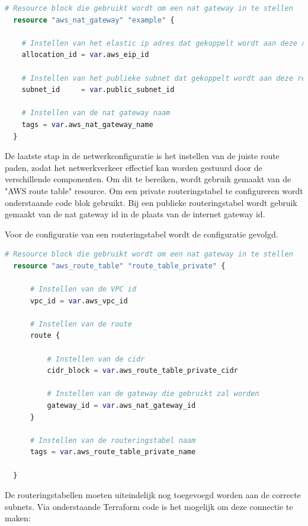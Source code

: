 \begin{lstlisting}[language=terraform]  
  # Resource block die gebruikt wordt om een nat gateway in te stellen
  resource "aws_nat_gateway" "example" {
  
    # Instellen van het elastic ip adres dat gekoppelt wordt aan deze resource
    allocation_id = var.aws_eip_id
  
    # Instellen van het publieke subnet dat gekoppelt wordt aan deze resource
    subnet_id     = var.public_subnet_id
  
    # Instellen van de nat gateway naam
    tags = var.aws_nat_gateway_name
  }
\end{lstlisting}
\clearpage

De laatste stap in de netwerkconfiguratie is het instellen van de juiste route paden, zodat het netwerkverkeer effectief kan worden gestuurd door de verschillende componenten. Om dit te bereiken, wordt gebruik gemaakt van de "AWS route table" resource. Om een private routeringstabel te configureren wordt onderstaande code blok gebruikt. Bij een publieke routeringstabel wordt gebruik gemaakt van de nat gateway id in de plaats van de internet gateway id.
\newline

Voor de configuratie van een routeringstabel wordt de configuratie gevolgd.
\newline

\begin{lstlisting}[language=terraform]  
  # Resource block die gebruikt wordt om een nat gateway in te stellen
  resource "aws_route_table" "route_table_private" {
  
      # Instellen van de VPC id
      vpc_id = var.aws_vpc_id
  
      # Instellen van de route
      route {
  
          # Instellen van de cidr
          cidr_block = var.aws_route_table_private_cidr
  
          # Instellen van de gateway die gebruikt zal worden
          gateway_id = var.aws_nat_gateway_id
      }
  
      # Instellen van de routeringstabel naam
      tags = var.aws_route_table_private_name
    
  }
\end{lstlisting}

\vspace{0.5cm}
De routeringstabellen moeten uiteindelijk nog toegevoegd worden aan de correcte subnets. Via onderstaande Terraform code is het mogelijk om deze connectie te maken:
\newline

